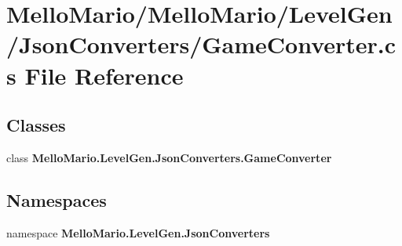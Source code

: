 \section{Mello\+Mario/\+Mello\+Mario/\+Level\+Gen/\+Json\+Converters/\+Game\+Converter.cs File Reference}
\label{GameConverter_8cs}
\subsection*{Classes}
\begin{DoxyCompactItemize}
\item 
class \textbf{ Mello\+Mario.\+Level\+Gen.\+Json\+Converters.\+Game\+Converter}
\end{DoxyCompactItemize}
\subsection*{Namespaces}
\begin{DoxyCompactItemize}
\item 
namespace \textbf{ Mello\+Mario.\+Level\+Gen.\+Json\+Converters}
\end{DoxyCompactItemize}
